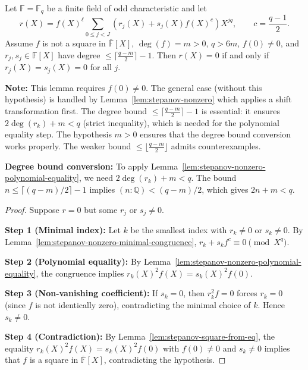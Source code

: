 \begin{lemma}\label{lem:stepanov-nonzero-eval-zero} \leanok {}
  Let $\mathbb{F} = \mathbb{F}_q$ be a finite field of odd characteristic and let
  \[
    r(X) = f(X)^\ell \sum_{0 \leq j < J} (r_j(X) + s_j(X) f(X)^c) X^{jq},
    \qquad c = \frac{q-1}{2}.
  \]
  Assume $f$ is not a square in $\overline{\mathbb{F}}[X]$, $\deg(f) = m > 0$, $q > 6m$, $f(0) \neq 0$, and $r_j, s_j \in \mathbb{F}[X]$ have degree $\leq \lceil\frac{q-m}{2}\rceil - 1$. Then $r(X) = 0$ if and only if $r_j(X) = s_j(X) = 0$ for all $j$.

  \textbf{Note:} This lemma requires $f(0) \neq 0$. The general case (without this hypothesis) is handled by Lemma~\ref{lem:stepanov-nonzero} which applies a shift transformation first. The degree bound $\leq \lceil\frac{q-m}{2}\rceil - 1$ is essential: it ensures $2\deg(r_k) + m < q$ (strict inequality), which is needed for the polynomial equality step. The hypothesis $m > 0$ ensures that the degree bound conversion works properly. The weaker bound $\leq \lfloor\frac{q-m}{2}\rfloor$ admits counterexamples.

  \textbf{Degree bound conversion:} To apply Lemma~\ref{lem:stepanov-nonzero-polynomial-equality}, we need $2\deg(r_k) + m < q$. The bound $n \leq \lceil(q-m)/2\rceil - 1$ implies $(n : \mathbb{Q}) < (q-m)/2$, which gives $2n + m < q$.
\end{lemma}
\begin{proof} \leanok
  Suppose $r = 0$ but some $r_j$ or $s_j \neq 0$.

  \textbf{Step 1 (Minimal index):} Let $k$ be the smallest index with $r_k \neq 0$ or $s_k \neq 0$. By Lemma~\ref{lem:stepanov-nonzero-minimal-congruence}, $r_k + s_k f^c \equiv 0 \pmod{X^q}$.

  \textbf{Step 2 (Polynomial equality):} By Lemma~\ref{lem:stepanov-nonzero-polynomial-equality}, the congruence implies $r_k(X)^2 f(X) = s_k(X)^2 f(0)$.

  \textbf{Step 3 (Non-vanishing coefficient):} If $s_k = 0$, then $r_k^2 f = 0$ forces $r_k = 0$ (since $f$ is not identically zero), contradicting the minimal choice of $k$. Hence $s_k \neq 0$.

  \textbf{Step 4 (Contradiction):} By Lemma~\ref{lem:stepanov-square-from-eq}, the equality $r_k(X)^2 f(X) = s_k(X)^2 f(0)$ with $f(0) \neq 0$ and $s_k \neq 0$ implies that $f$ is a square in $\overline{\mathbb{F}}[X]$, contradicting the hypothesis.
\end{proof}

